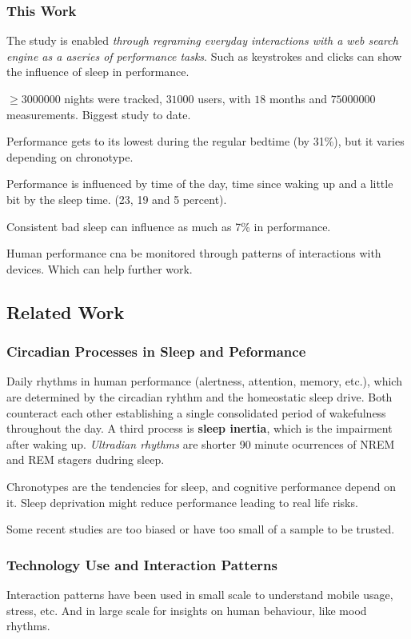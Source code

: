 \documentclass{IEEEtran}
\begin{document}
      \subsubsection{This Work}
        The study is enabled \textit{through regraming everyday interactions with a web search engine as a aseries of performance tasks}. Such as keystrokes and clicks can show the influence of sleep in performance. \par 
        $\geq 3000000$ nights were tracked, $31000$ users, with $18$ months and $75000000$ measurements. Biggest study to date. \par 
        Performance gets to its lowest during the regular bedtime (by 31\%), but it varies depending on chronotype. \par 
        Performance is influenced by time of the day, time since waking up and a little bit by the sleep time. (23, 19 and 5 percent). \par 
        Consistent bad sleep can influence as much as 7\% in performance. \par 
        Human performance cna be monitored through patterns of interactions with devices. Which can help further work.
    \subsection{Related Work}
      \subsubsection{Circadian Processes in Sleep and Peformance}
        Daily rhythms in human performance (alertness, attention, memory, etc.), which are determined by the circadian ryhthm and the homeostatic sleep drive. Both counteract each other establishing a single consolidated period of wakefulness throughout the day. A third process is \textbf{sleep inertia}, which is the impairment after waking up. \textit{Ultradian rhythms} are shorter 90 minute ocurrences of NREM and REM stagers dudring sleep.\par 
        Chronotypes are the tendencies for sleep, and cognitive performance depend on it. Sleep deprivation might reduce performance leading to real life risks. \par 
        Some recent studies are too biased or have too small of a sample to be trusted.
      \subsubsection{Technology Use and Interaction Patterns}
        Interaction patterns have been used in small scale to understand mobile usage, stress, etc. And in large scale for insights on human behaviour, like mood rhythms.
\end{document}
